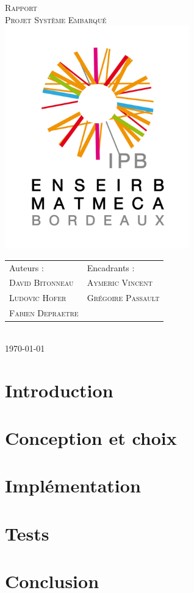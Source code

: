 \documentclass[a4paper, 11pt]{article}
\begin{document}
\begin{titlepage}
  \begin{center}
    \textsc{\huge Rapport}\\[3cm]
	\textsc{\Huge Projet Système Embarqué}\\[3cm]
    \includegraphics[width=8cm]{logo-IPB.jpg}\\[3cm]
	\begin{tabular*}{\textwidth}{@{} m{12cm} l}
		\large{Auteurs :} & \large{Encadrants :} \\[0.5cm]
	    \textsc{\Large David Bitonneau} & \textsc{\Large Aymeric Vincent} \\
	    \textsc{\Large Ludovic Hofer}   & \textsc{\Large Grégoire Passault} \\ 
      \textsc{\Large Fabien Depraetre} & \\
    \end{tabular*}
	\\[2cm]
    \textsc{\Large \today}\\

\end{center}

\end{titlepage}

\clearpage
\tableofcontents
\clearpage

\section{Introduction}


\section{Conception et choix}


\section{Implémentation}


\section{Tests}


\section{Conclusion}

\end{document}
